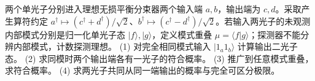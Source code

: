 两个单光子分别进入理想无损平衡分束器两个输入端 \(a,b\)，输出端为 \(c,d\)。采取产生算符约定 \(a^\dagger\mapsto(c^\dagger+d^\dagger)/\sqrt2\)、\(b^\dagger\mapsto(c^\dagger-d^\dagger)/\sqrt2\)。若输入两光子的未观测内部模式分别是归一化单光子态 \(|f\rangle,|g\rangle\)，定义模式重叠 \(\mu=\langle f|g\rangle\)；探测器不能分辨内部模式，计数探测理想。
(1) 对完全相同模式输入 \(|1_a1_b\rangle\) 计算输出二光子态。
(2) 求同模时两个输出端各有一光子的符合概率。
(3) 推广到任意模式重叠，求符合概率。
(4) 求两光子共同从同一端输出的概率与完全可区分极限。
